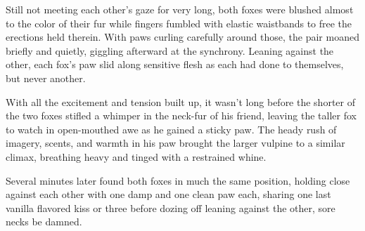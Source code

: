 Still not meeting each other's gaze for very long, both foxes were blushed almost to the color of their fur while fingers fumbled with elastic waistbands to free the erections held therein. With paws curling carefully around those, the pair moaned briefly and quietly, giggling afterward at the synchrony. Leaning against the other, each fox's paw slid along sensitive flesh as each had done to themselves, but never another.

With all the excitement and tension built up, it wasn't long before the shorter of the two foxes stifled a whimper in the neck-fur of his friend, leaving the taller fox to watch in open-mouthed awe as he gained a sticky paw. The heady rush of imagery, scents, and warmth in his paw brought the larger vulpine to a similar climax, breathing heavy and tinged with a restrained whine.

Several minutes later found both foxes in much the same position, holding close against each other with one damp and one clean paw each, sharing one last vanilla flavored kiss or three before dozing off leaning against the other, sore necks be damned.
